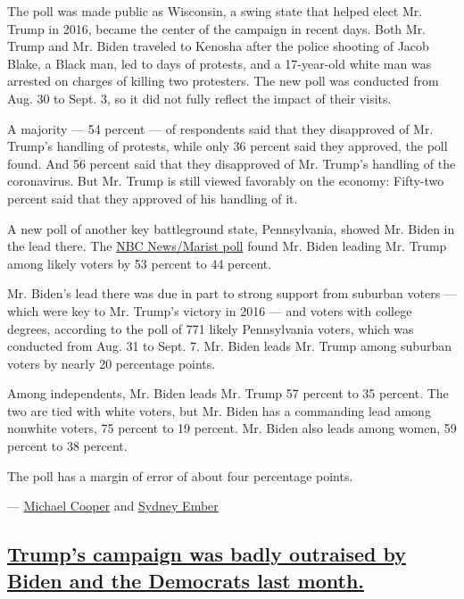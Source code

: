 The poll was made public as Wisconsin, a swing state that helped elect
Mr. Trump in 2016, became the center of the campaign in recent days.
Both Mr. Trump and Mr. Biden traveled to Kenosha after the police
shooting of Jacob Blake, a Black man, led to days of protests, and a
17-year-old white man was arrested on charges of killing two protesters.
The new poll was conducted from Aug. 30 to Sept. 3, so it did not fully
reflect the impact of their visits.

A majority --- 54 percent --- of respondents said that they disapproved
of Mr. Trump's handling of protests, while only 36 percent said they
approved, the poll found. And 56 percent said that they disapproved of
Mr. Trump's handling of the coronavirus. But Mr. Trump is still viewed
favorably on the economy: Fifty-two percent said that they approved of
his handling of it.

A new poll of another key battleground state, Pennsylvania, showed Mr.
Biden in the lead there. The
\href{http://maristpoll.marist.edu/wp-content/uploads/2020/09/NBC-News_Marist-Poll_PA-Written-Summary-of-Findings_2009081204.pdf}{NBC
News/Marist poll} found Mr. Biden leading Mr. Trump among likely voters
by 53 percent to 44 percent.

Mr. Biden's lead there was due in part to strong support from suburban
voters --- which were key to Mr. Trump's victory in 2016 --- and voters
with college degrees, according to the poll of 771 likely Pennsylvania
voters, which was conducted from Aug. 31 to Sept. 7. Mr. Biden leads Mr.
Trump among suburban voters by nearly 20 percentage points.

Among independents, Mr. Biden leads Mr. Trump 57 percent to 35 percent.
The two are tied with white voters, but Mr. Biden has a commanding lead
among nonwhite voters, 75 percent to 19 percent. Mr. Biden also leads
among women, 59 percent to 38 percent.

The poll has a margin of error of about four percentage points.

--- \href{https://www.nytimes3xbfgragh.onion/by/michael-cooper}{Michael
Cooper} and
\href{https://www.nytimes3xbfgragh.onion/by/sydney-ember}{Sydney Ember}

\hypertarget{trumps-campaign-was-badly-outraised-by-biden-and-the-democrats-last-month}{%
\subsection{\texorpdfstring{\protect\hyperlink{trumps-campaign-was-badly-outraised-by-biden-and-the-democrats-last-month}{Trump's
campaign was badly outraised by Biden and the Democrats last
month.}}{Trump's campaign was badly outraised by Biden and the Democrats last month.}}\label{trumps-campaign-was-badly-outraised-by-biden-and-the-democrats-last-month}}

